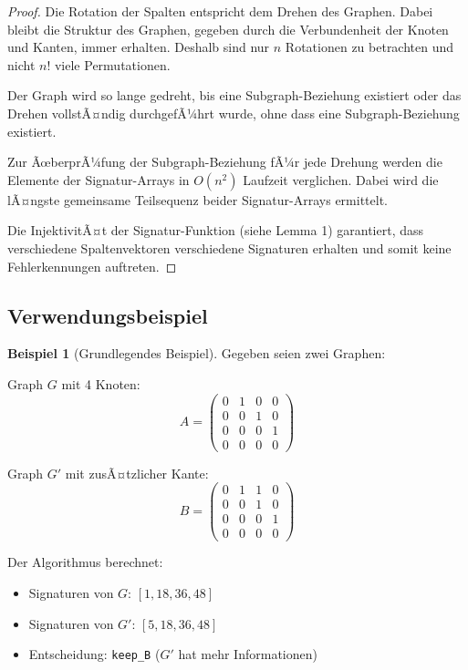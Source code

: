 ﻿\documentclass[a4paper,12pt]{article}
\theoremstyle{definition}
\newtheorem{beispiel}{Beispiel}
\begin{document}
\begin{proof}
	Die Rotation der Spalten entspricht dem Drehen des Graphen. Dabei bleibt die Struktur des Graphen, gegeben durch die Verbundenheit der Knoten und Kanten, immer erhalten. Deshalb sind nur $n$ Rotationen zu betrachten und nicht $n!$ viele Permutationen.
	
	Der Graph wird so lange gedreht, bis eine Subgraph-Beziehung existiert oder das Drehen vollstÃ¤ndig durchgefÃ¼hrt wurde, ohne dass eine Subgraph-Beziehung existiert.
	
	Zur ÃœberprÃ¼fung der Subgraph-Beziehung fÃ¼r jede Drehung werden die Elemente der Signatur-Arrays in $O(n^2)$ Laufzeit verglichen. Dabei wird die lÃ¤ngste gemeinsame Teilsequenz beider Signatur-Arrays ermittelt.
	
	Die InjektivitÃ¤t der Signatur-Funktion (siehe Lemma 1) garantiert, dass verschiedene Spaltenvektoren verschiedene Signaturen erhalten und somit keine Fehlerkennungen auftreten.
\end{proof}

\subsection{Verwendungsbeispiel}

\begin{beispiel}[Grundlegendes Beispiel]
	Gegeben seien zwei Graphen:
	
	Graph $G$ mit 4 Knoten:
	\[
	A = \begin{pmatrix}
		0 & 1 & 0 & 0 \\
		0 & 0 & 1 & 0 \\
		0 & 0 & 0 & 1 \\
		0 & 0 & 0 & 0
	\end{pmatrix}
	\]
	
	Graph $G'$ mit zusÃ¤tzlicher Kante:
	\[
	B = \begin{pmatrix}
		0 & 1 & 1 & 0 \\
		0 & 0 & 1 & 0 \\
		0 & 0 & 0 & 1 \\
		0 & 0 & 0 & 0
	\end{pmatrix}
	\]
	
	Der Algorithmus berechnet:
	\begin{itemize}
		\item Signaturen von $G$: $[1, 18, 36, 48]$
		\item Signaturen von $G'$: $[5, 18, 36, 48]$
		\item Entscheidung: \texttt{keep\_B} ($G'$ hat mehr Informationen)
	\end{itemize}
\end{beispiel}
\end{document}
